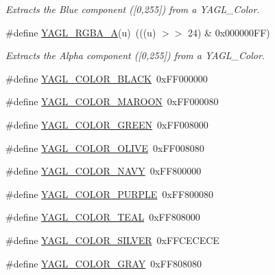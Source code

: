 \begin{DoxyCompactItemize}
\begin{DoxyCompactList}\small\item\em Extracts the Blue component (\mbox{[}0,255\mbox{]}) from a Y\-A\-G\-L\-\_\-\-Color. \end{DoxyCompactList}\item 
\hypertarget{group____consts__color_ga064f8440db8849d5edff5a5249683850}{\#define \hyperlink{group____consts__color_ga064f8440db8849d5edff5a5249683850}{Y\-A\-G\-L\-\_\-\-R\-G\-B\-A\-\_\-\-A}(u)~(((u) $>$$>$ 24) \& 0x000000\-F\-F)}\label{group____consts__color_ga064f8440db8849d5edff5a5249683850}

\begin{DoxyCompactList}\small\item\em Extracts the Alpha component (\mbox{[}0,255\mbox{]}) from a Y\-A\-G\-L\-\_\-\-Color. \end{DoxyCompactList}\item 
\#define \hyperlink{group____consts__color_gaafd0da27df08201621d87a91b8641616}{Y\-A\-G\-L\-\_\-\-C\-O\-L\-O\-R\-\_\-\-B\-L\-A\-C\-K}~0x\-F\-F000000
\item 
\#define \hyperlink{group____consts__color_gaade8f07e545d5fdb89215c4c88b5129d}{Y\-A\-G\-L\-\_\-\-C\-O\-L\-O\-R\-\_\-\-M\-A\-R\-O\-O\-N}~0x\-F\-F000080
\item 
\#define \hyperlink{group____consts__color_gacf58cebf7f69ecd3cb5c9653710dc2d8}{Y\-A\-G\-L\-\_\-\-C\-O\-L\-O\-R\-\_\-\-G\-R\-E\-E\-N}~0x\-F\-F008000
\item 
\#define \hyperlink{group____consts__color_ga0b7b6525e6e32f63cb4f2311891646f9}{Y\-A\-G\-L\-\_\-\-C\-O\-L\-O\-R\-\_\-\-O\-L\-I\-V\-E}~0x\-F\-F008080
\item 
\#define \hyperlink{group____consts__color_gaeda38939c485f1a76ab580aae46f3544}{Y\-A\-G\-L\-\_\-\-C\-O\-L\-O\-R\-\_\-\-N\-A\-V\-Y}~0x\-F\-F800000
\item 
\#define \hyperlink{group____consts__color_ga881c60d0978f252f61dcba77fe35d3aa}{Y\-A\-G\-L\-\_\-\-C\-O\-L\-O\-R\-\_\-\-P\-U\-R\-P\-L\-E}~0x\-F\-F800080
\item 
\#define \hyperlink{group____consts__color_ga9fa828278bbb98bcc41023628eee4be3}{Y\-A\-G\-L\-\_\-\-C\-O\-L\-O\-R\-\_\-\-T\-E\-A\-L}~0x\-F\-F808000
\item 
\#define \hyperlink{group____consts__color_ga14744671d432f3df895beefb832634fd}{Y\-A\-G\-L\-\_\-\-C\-O\-L\-O\-R\-\_\-\-S\-I\-L\-V\-E\-R}~0x\-F\-F\-C\-E\-C\-E\-C\-E
\item 
\#define \hyperlink{group____consts__color_gaf31bbd40751383c7fcfe96ca709e2b4c}{Y\-A\-G\-L\-\_\-\-C\-O\-L\-O\-R\-\_\-\-G\-R\-A\-Y}~0x\-F\-F808080

\end{DoxyCompactItemize}
